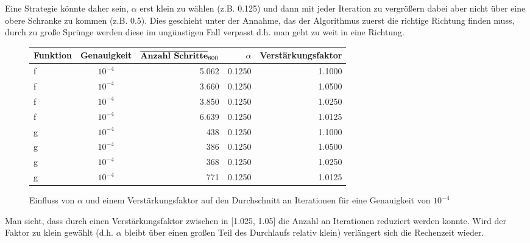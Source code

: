\documentclass[a4paper, 12pt]{report}
\begin{document}
Eine Strategie könnte daher sein, $\alpha$ erst klein zu wählen (z.B. 0.125) und dann mit jeder Iteration zu vergrößern dabei aber
nicht über eine obere Schranke zu kommen (z.B. 0.5). Dies geschieht unter der Annahme, das der Algorithmus zuerst die richtige
Richtung finden muss, durch zu große Sprünge werden diese im ungünstigen Fall verpasst d.h. man geht zu weit in eine Richtung.

\begin{figure}[H]
  \centering
  \def\arraystretch{1.25}
  \begin{tabular}{l|c|r|r|r}
    \hline
    \textbf{Funktion} & \textbf{Genauigkeit} & $\overline{ \text{\textbf{Anzahl Schritte}} }_{600}$ & \textbf{$\alpha$} & \textbf{Verstärkungsfaktor}\\
    \hline
    f & $10^{-4}$ & 5.062 & 0.1250 & 1.1000\\
    f & $10^{-4}$ & 3.660 & 0.1250 & 1.0500\\
    f & $10^{-4}$ & 3.850 & 0.1250 & 1.0250\\
    f & $10^{-4}$ & 6.639 & 0.1250 & 1.0125\\
    g & $10^{-4}$ & 438 & 0.1250 & 1.1000\\
    g & $10^{-4}$ & 386 & 0.1250 & 1.0500\\
    g & $10^{-4}$ & 368 & 0.1250 & 1.0250\\
    g & $10^{-4}$ & 771 & 0.1250 & 1.0125\\
    \hline
  \end{tabular}
  \caption{Einfluss von $\alpha$ und einem Verstärkungsfaktor auf den Durchschnitt an Iterationen für eine Genauigkeit von $10^{-4}$}
\end{figure}

Man sieht, dass durch einen Verstärkungsfaktor zwischen in [1.025, 1.05] die Anzahl an Iterationen reduziert werden konnte. Wird der
Faktor zu klein gewählt (d.h. $\alpha$ bleibt über einen großen Teil des Durchlaufs relativ klein) verlängert sich die Rechenzeit wieder.
\end{document}
